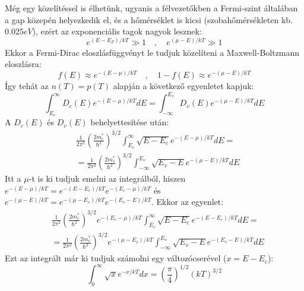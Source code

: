 \documentclass[../main.tex]{subfiles}
\begin{document}
Még egy közelítéssel is élhetünk, ugyanis a félvezetőkben a Fermi-szint általában a gap közepén helyezkedik el, és a hőmérséklet is kicsi (szobahőmérsékleten kb. $0.025 eV$), ezért az exponenciális tagok nagyok lesznek:
\begin{equation}
    e^{(E - E_F) / kT} \gg 1 \quad , \quad e^{(\mu - E) / kT} \gg 1
\end{equation}
Ekkor a Fermi-Dirac eloszlásfüggvényt le tudjuk közelíteni a Maxwell-Boltzmann eloszlásra:
\begin{equation}
    f(E) \approx e^{-(E - \mu) / kT} \quad , \quad 1 - f(E) \approx e^{-(\mu - E) / kT}
\end{equation}
Így tehát az $n(T) = p(T)$ alapján a következő egyenletet kapjuk:
\begin{equation}
    \int_{E_c}^{\infty} D_c (E) e^{-(E - \mu) / kT} dE = \int_{-\infty}^{E_v} D_v (E) e^{-(\mu - E) / kT} dE
\end{equation}
A $D_c(E)$ és $D_v(E)$ behelyettesítése után:
\begin{equation}
    \begin{aligned}
        &\frac{1}{2 \pi^2} \left(\frac{2 m_c^*}{\hbar^2}\right)^{3/2} \int_{E_c}^{\infty} \sqrt{E - E_c} e^{-(E - \mu) / kT} dE = \\
        &= \frac{1}{2 \pi^2} \left(\frac{2 m_v^*}{\hbar^2}\right)^{3/2} \int_{-\infty}^{E_v} \sqrt{E_v - E} e^{-(\mu - E) / kT} dE
    \end{aligned}
\end{equation} 
Itt a $\mu$-t is ki tudjuk emelni az integrálból, hiszen $e^{-(E - \mu) / kT} = e^{-(E - E_c)/kT} e^{-(E_c - \mu)/kT}$ és $e^{-(\mu - E) / kT} = e^{-(\mu - E_v)/kT} e^{-(E_v - E)/kT}$. Ekkor az egyenlet:
\begin{equation}
    \begin{aligned}
        &\frac{1}{2 \pi^2} \left(\frac{2 m_c^*}{\hbar^2}\right)^{3/2} e^{-(E_c - \mu) / kT} \int_{E_c}^{\infty} \sqrt{E - E_c} e^{-(E - E_c) / kT} dE = \\
        &= \frac{1}{2 \pi^2} \left(\frac{2 m_v^*}{\hbar^2}\right)^{3/2} e^{-(\mu - E_v) / kT} \int_{-\infty}^{E_v} \sqrt{E_v - E} e^{-(E_v - E) / kT} dE
    \end{aligned}
\end{equation}
Ezt az integrált már ki tudjuk számolni egy változócserével ($x = E - E_c$):
\begin{equation}
    \int_{0}^{\infty} \sqrt{x} e^{-x / kT} dx = \left(\frac{\pi}{4}\right)^{1/2} (kT)^{3/2}
\end{equation}
\end{document}
